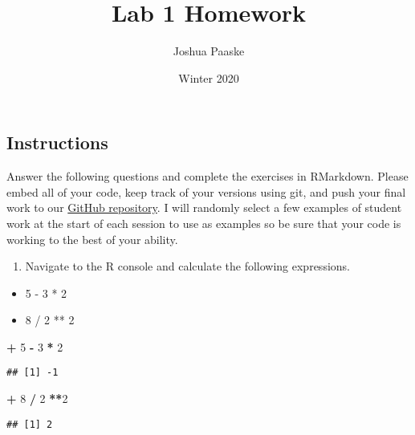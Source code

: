 \documentclass[]{article}
\title{Lab 1 Homework}
\author{Joshua Paaske}
\date{Winter 2020}
\newenvironment{Shaded}{\begin{snugshade}}{\end{snugshade}}
\newcommand{\DecValTok}[1]{\textcolor[rgb]{0.00,0.00,0.81}{#1}}
\newcommand{\OperatorTok}[1]{\textcolor[rgb]{0.81,0.36,0.00}{\textbf{#1}}}
\newcommand{\StringTok}[1]{\textcolor[rgb]{0.31,0.60,0.02}{#1}}
\providecommand{\tightlist}{%
  \setlength{\itemsep}{0pt}\setlength{\parskip}{0pt}}
\begin{document}
\maketitle

\hypertarget{instructions}{%
\subsection{Instructions}\label{instructions}}

Answer the following questions and complete the exercises in RMarkdown.
Please embed all of your code, keep track of your versions using git,
and push your final work to our
\href{https://github.com/FRS417-DataScienceBiologists}{GitHub
repository}. I will randomly select a few examples of student work at
the start of each session to use as examples so be sure that your code
is working to the best of your ability.

\begin{enumerate}
\def\labelenumi{\arabic{enumi}.}
\tightlist
\item
  Navigate to the R console and calculate the following expressions.\\
\end{enumerate}

\begin{itemize}
\tightlist
\item
  5 - 3 * 2\\
\item
  8 / 2 ** 2
\end{itemize}

\begin{Shaded}
\begin{Highlighting}[]
\OperatorTok{+}\StringTok{ }\DecValTok{5} \OperatorTok{-}\StringTok{ }\DecValTok{3} \OperatorTok{*}\StringTok{ }\DecValTok{2}
\end{Highlighting}
\end{Shaded}

\begin{verbatim}
## [1] -1
\end{verbatim}

\begin{Shaded}
\begin{Highlighting}[]
\OperatorTok{+}\StringTok{ }\DecValTok{8} \OperatorTok{/}\StringTok{ }\DecValTok{2} \OperatorTok{**}\DecValTok{2}
\end{Highlighting}
\end{Shaded}

\begin{verbatim}
## [1] 2
\end{verbatim}
\end{document}
